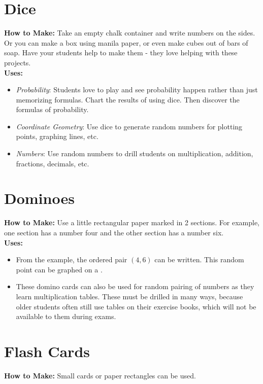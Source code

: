 \section{Dice} \label{dice}
\textbf{How to Make:} Take an empty chalk container and write numbers on the sides. Or you can make a box using manila paper, or even make cubes out of bars of soap. Have your students help to make them - they love helping with these projects.\\

\noindent\textbf{Uses:}
\begin{itemize}
\item \emph{Probability}: Students love to play and see probability happen rather than just memorizing formulas. Chart the results of using dice. Then discover the formulas of probability.
\item \emph{Coordinate Geometry}: Use dice to generate random numbers for plotting points, graphing lines, etc.
\item \emph{Numbers}: Use random numbers to drill students on multiplication, addition, fractions, decimals, etc.
\end{itemize}

\section{Dominoes} \label{dominoes}
\textbf{How to Make:} Use a little rectangular paper marked in 2 sections. For example, one section has a number four and the other section has a number six.\\

\noindent\textbf{Uses:}
\begin{itemize}
\item From the example, the ordered pair $(4,6)$ can be written. This random point can be graphed on a .
\item These domino cards can also be used for random pairing of numbers as they learn multiplication tables. These must be drilled in many ways, because older students often still use tables on their exercise books, which will not be available to them during exams.
\end{itemize}

\section{Flash Cards} \label{flashcards}
\textbf{How to Make:} Small cards or paper rectangles can be used.\\

